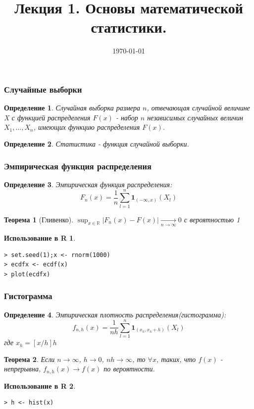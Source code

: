 \documentclass{beamer}
\date{\today}
\newtheorem{thm}{Теорема}
\newtheorem{defn}{Определение}
\newtheorem{exmpr}{Использование в R}
\begin{document}
\title[\hspace{15em}\insertframenumber/\inserttotalframenumber]{Лекция 1. Основы математической статистики.}
\begin{frame}
  \titlepage
\end{frame}
 
 
\begin{frame}
\frametitle{Случайные выборки}
\begin{defn}Случайная выборка размера $n$, отвечающая случайной величине X с функцией распределения $F(x)$ - набор $n$ независимых случайных величин $X_1,\ldots,X_n$, имеющих функцию распределения $F(x)$.
\end{defn}
\begin{defn}
Статистика - функция случайной выборки.
\end{defn}
\end{frame}
 
\begin{frame}[containsverbatim]
\frametitle{Эмпирическая функция распределения}
\begin{defn}
Эмпирическая функция распределения:
$$F_n(x)=\frac{1}{n}\sum_{l=1}^n{\mathbf{1}_{(-\infty,x)}(X_l)}$$
\end{defn}
\begin{thm}[Гливенко]
$\sup_{x\in \mathbb{R}}{|F_n(x)-F(x)|}\xrightarrow[n\rightarrow\infty]{}0$ с вероятностью 1
\end{thm}
\begin{exmpr}
\begin{verbatim}
> set.seed(1);x <- rnorm(1000)
> ecdfx <- ecdf(x)
> plot(ecdfx)
\end{verbatim}
\end{exmpr}
\end{frame}

\begin{frame}[containsverbatim]
\frametitle{Гистограмма}
\begin{defn}
Эмпирическая плотность распределения(гистограмма):
$$f_{n,h}(x)=\frac{1}{nh}\sum_{l=1}^n{\mathbf{1}_{(x_h,x_h+h)}(X_l)}$$
где $x_h=[x/h]h$
\end{defn}
\begin{thm}
Если $n\rightarrow \infty$, $h\rightarrow 0$, $nh\rightarrow\infty$, то $\forall x$, таких, что $f(x)$ - непрерывна, $f_{n,h}(x)\rightarrow f(x)$ по вероятности.
\end{thm}
\begin{exmpr}
\begin{verbatim}
> h <- hist(x)
\end{verbatim}
\end{exmpr}

\end{frame}
\end{document}
